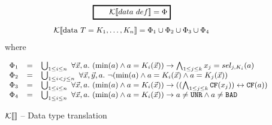 \documentclass[preprint]{sigplanconf}
\begin{document}
\begin{figure}
  $$ \ruleform{\ktrans{data~def} = \Phi} $$
$$\ktrans{\mbox{data } T = K_1, \dots, K_n} = \Phi_1 \cup \Phi_2 \cup \Phi_3 \cup \Phi_4$$
 \hspace{5.6cm}where
  \begin{center}
    \[  \begin{array}{rcl}
      \Phi_1 &=& \bigcup_{1 \leq i \leq n}~\forall \vec{x},a.~(\min{a} \land a = K_i(\vec{x})) \to \bigwedge_{1 \leq j \leq k} x_j = sel_{j,K_i}(a) \\
      \Phi_2 &=& \bigcup_{1 \leq i < j \leq n}~\forall \vec{x},\vec{y},a.~ \lnot (\min{a} \land a = K_i(\vec{x}) \land a = K_j(\vec{x})) \\
      \Phi_3 &=& \bigcup_{1 \leq i \leq n}~\forall \vec{x},a.~(\min{a} \land a = K_i(\vec{x})) \to ((\bigwedge_{1 \leq j \leq k} \cf{x_j}) \tot \cf{a}) \\
      \Phi_4 &=& \bigcup_{1 \leq i \leq n}~\forall \vec{x},a.~(\min{a} \land a = K_i(\vec{x})) \to a \neq \unr \land a \neq \bad 
    \end{array} \]
  \end{center}
  \caption{$\ktrans{}$ -- Data type translation}
  \label{ktrans}
\end{figure}
\end{document}
